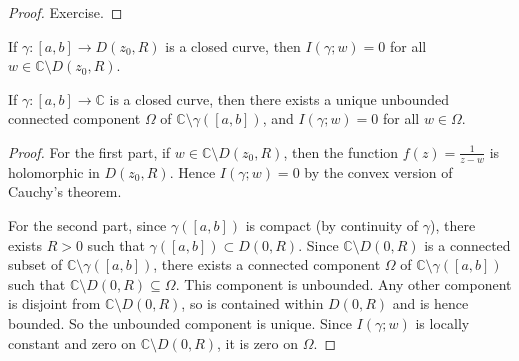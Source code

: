 \begin{proof}
	Exercise.
\end{proof}
\begin{proposition}
	If \( \gamma \colon [a,b] \to D(z_0, R) \) is a closed curve, then \( I(\gamma;w) = 0 \) for all \( w \in \mathbb C \setminus D(z_0,R) \).

	If \( \gamma \colon [a,b] \to \mathbb C \) is a closed curve, then there exists a unique unbounded connected component \( \Omega \) of \( \mathbb C \setminus \gamma([a,b]) \), and \( I(\gamma;w) = 0 \) for all \( w \in \Omega \).
\end{proposition}
\begin{proof}
	For the first part, if \( w \in \mathbb C \setminus D(z_0, R) \), then the function \( f(z) = \frac{1}{z-w} \) is holomorphic in \( D(z_0,R) \).
	Hence \( I(\gamma;w) = 0 \) by the convex version of Cauchy's theorem.

	For the second part, since \( \gamma([a,b]) \) is compact (by continuity of \( \gamma \)), there exists \( R > 0 \) such that \( \gamma([a,b]) \subset D(0,R) \).
	Since \( \mathbb C \setminus D(0,R) \) is a connected subset of \( \mathbb C \setminus \gamma([a,b]) \), there exists a connected component \( \Omega \) of \( \mathbb C \setminus \gamma([a,b]) \) such that \( \mathbb C \setminus D(0,R) \subseteq \Omega \).
	This component is unbounded.
	Any other component is disjoint from \( \mathbb C \setminus D(0,R) \), so is contained within \( D(0,R) \) and is hence bounded.
	So the unbounded component is unique.
	Since \( I(\gamma;w) \) is locally constant and zero on \( \mathbb C \setminus D(0,R) \), it is zero on \( \Omega \).
\end{proof}

